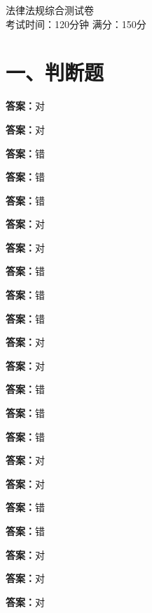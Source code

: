 \documentclass[12pt]{ctexart}
\begin{document}
\printanswers
\vspace*{-2em}
\begin{center}
  {\LARGE 法律法规综合测试卷}\\[4pt]
  考试时间：120分钟 \quad 满分：150分
\end{center}
\vspace{0.5em}

\section*{一、判断题}
\begin{questions}
\question {}\ifprintanswers\par\textbf{答案：}对\fi
\question {}\ifprintanswers\par\textbf{答案：}对\fi
\question {}\ifprintanswers\par\textbf{答案：}错\fi
\question {}\ifprintanswers\par\textbf{答案：}错\fi
\question {}\ifprintanswers\par\textbf{答案：}错\fi
\question {}\ifprintanswers\par\textbf{答案：}对\fi
\question {}\ifprintanswers\par\textbf{答案：}对\fi
\question {}\ifprintanswers\par\textbf{答案：}错\fi
\question {}\ifprintanswers\par\textbf{答案：}错\fi
\question {}\ifprintanswers\par\textbf{答案：}错\fi
\question {}\ifprintanswers\par\textbf{答案：}对\fi
\question {}\ifprintanswers\par\textbf{答案：}对\fi
\question {}\ifprintanswers\par\textbf{答案：}错\fi
\question {}\ifprintanswers\par\textbf{答案：}错\fi
\question {}\ifprintanswers\par\textbf{答案：}错\fi
\question {}\ifprintanswers\par\textbf{答案：}对\fi
\question {}\ifprintanswers\par\textbf{答案：}对\fi
\question {}\ifprintanswers\par\textbf{答案：}错\fi
\question {}\ifprintanswers\par\textbf{答案：}错\fi
\question {}\ifprintanswers\par\textbf{答案：}对\fi
\question {}\ifprintanswers\par\textbf{答案：}对\fi
\question {}\ifprintanswers\par\textbf{答案：}对\fi

\end{questions}
\end{document}
